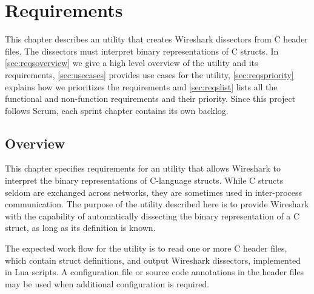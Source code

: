 \chapter{Requirements}
\label{chap:requirements}
This chapter describes an utility that creates Wireshark dissectors from C
header files. The dissectors must interpret binary representations of C
structs. In \autoref{sec:reqsoverview} we give a high level overview of the
utility and its requirements, \autoref{sec:usecases} provides use cases for the
utility, \autoref{sec:reqspriority} explains how we prioritizes the
requirements and \autoref{sec:reqslist} lists all the functional and
non-function requirements and their priority. Since this project follows Scrum,
each sprint chapter contains its own backlog.

\section{Overview}
\label{sec:reqsoverview}
This chapter specifies requirements for an utility that allows Wireshark to
interpret the binary representations of C-language structs. While C structs
seldom are exchanged across networks, they are sometimes used in inter-process
communication. The purpose of the utility described here is to provide
Wireshark with the capability of automatically dissecting the binary
representation of a C struct, as long as its definition is known.

The expected work flow for the utility is to read one or more C header files,
which contain struct definitions, and output Wireshark dissectors, implemented
in Lua scripts. A configuration file or source code annotations in the header
files may be used when additional configuration is required.

